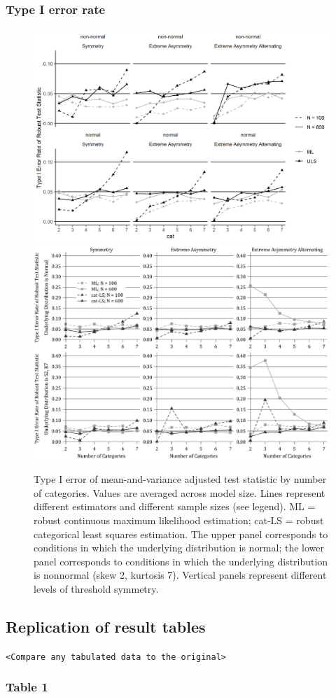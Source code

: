 \documentclass[10,a4paperpaper,]{article}
\begin{document}
\subsubsection{Type I error rate}
\begin{figure}
\includegraphics[width=0.49\linewidth]{./figures/fig_9} \includegraphics[width=0.49\linewidth]{./figures/fig9_original} \caption{Type I error of mean-and-variance adjusted test statistic by number of categories. Values are averaged across model size. Lines represent different estimators and different sample sizes (see legend). ML = robust continuous maximum likelihood estimation; cat-LS = robust categorical least squares estimation. The upper panel corresponds to conditions in which the underlying distribution is normal; the lower panel corresponds to conditions in which the underlying distribution is nonnormal (skew 2, kurtosis 7). Vertical panels represent different levels of threshold symmetry.}\label{fig:fig9}
\end{figure}

\subsection{Replication of result tables}

\texttt{\textless{}Compare\ any\ tabulated\ data\ to\ the\ original\textgreater{}}

\subsubsection{Table 1}
\end{document}
